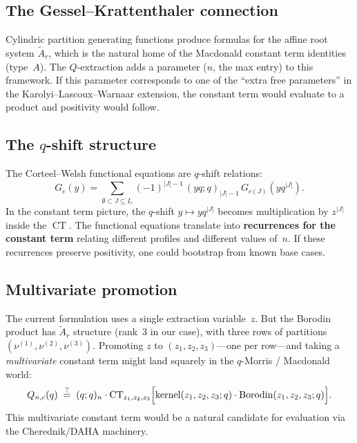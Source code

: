 \documentclass[11pt]{article}
\newcommand{\CT}{\operatorname{CT}}
\begin{document}
\subsection{The Gessel--Krattenthaler connection}

Cylindric partition generating functions produce formulas
for the affine root system $\widetilde{A}_r$, which is
the natural home of the Macdonald constant term identities
(type~$A$). The $Q$-extraction adds a parameter ($n$, the
max entry) to this framework. If this parameter corresponds
to one of the ``extra free parameters'' in the
Karolyi--Lascoux--Warnaar extension, the constant term would
evaluate to a product and positivity would follow.

\subsection{The $q$-shift structure}

The Corteel--Welsh functional equations are $q$-shift relations:
\begin{equation}\label{eq:CW-shift}
  G_c(y) = \sum_{\emptyset \subset J \subseteq I_c}
  (-1)^{|J|-1}\,
  (yq;q)_{|J|-1}\, G_{c(J)}(yq^{|J|}).
\end{equation}
In the constant term picture, the $q$-shift $y \mapsto yq^{|J|}$
becomes multiplication by $z^{|J|}$ inside the $\CT$.
The functional equations translate into
\textbf{recurrences for the constant term} relating different
profiles and different values of~$n$. If these recurrences
preserve positivity, one could bootstrap from known base cases.

\subsection{Multivariate promotion}

The current formulation uses a single extraction variable~$z$.
But the Borodin product has $\widetilde{A}_r$ structure
(rank~3 in our case), with three rows of partitions
$(\nu^{(1)}, \nu^{(2)}, \nu^{(3)})$. Promoting
$z$ to $(z_1, z_2, z_3)$---one per row---and taking a
\emph{multivariate} constant term might land squarely in the
$q$-Morris / Macdonald world:
\begin{equation}\label{eq:Q-multivariate}
  Q_{n,c}(q)
  \;\stackrel{?}{=}\;
  (q;q)_n \cdot
  \CT_{z_1, z_2, z_3}\Bigl[
    \text{kernel}(z_1, z_2, z_3; q)
    \cdot \text{Borodin}(z_1, z_2, z_3; q)
  \Bigr].
\end{equation}
This multivariate constant term would be a natural candidate
for evaluation via the Cherednik/DAHA machinery.
\end{document}
